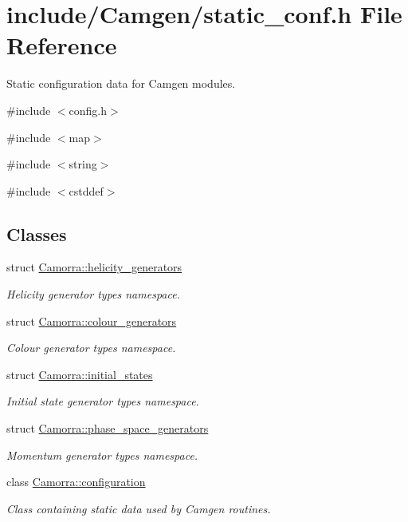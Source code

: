 \hypertarget{a00599}{
\section{include/Camgen/static\_\-conf.h File Reference}
\label{a00599}
}


Static configuration data for Camgen modules.  


{\ttfamily \#include $<$config.h$>$}\par
{\ttfamily \#include $<$map$>$}\par
{\ttfamily \#include $<$string$>$}\par
{\ttfamily \#include $<$cstddef$>$}\par
\subsection*{Classes}
\begin{DoxyCompactItemize}
\item 
struct \hyperlink{a00249}{Camorra::helicity\_\-generators}
\begin{DoxyCompactList}\small\item\em Helicity generator types namespace. \end{DoxyCompactList}\item 
struct \hyperlink{a00079}{Camorra::colour\_\-generators}
\begin{DoxyCompactList}\small\item\em Colour generator types namespace. \end{DoxyCompactList}\item 
struct \hyperlink{a00285}{Camorra::initial\_\-states}
\begin{DoxyCompactList}\small\item\em Initial state generator types namespace. \end{DoxyCompactList}\item 
struct \hyperlink{a00384}{Camorra::phase\_\-space\_\-generators}
\begin{DoxyCompactList}\small\item\em Momentum generator types namespace. \end{DoxyCompactList}\item 
class \hyperlink{a00091}{Camorra::configuration}
\begin{DoxyCompactList}\small\item\em Class containing static data used by Camgen routines. \end{DoxyCompactList}\end{DoxyCompactItemize}
